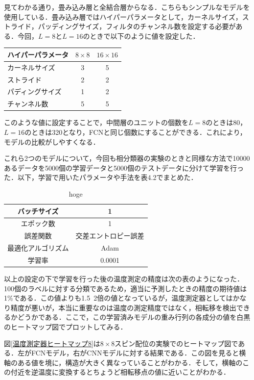 \documentclass[a4paper,11pt]{jsreport}
\begin{document}
見てわかる通り，畳み込み層と全結合層からなる．こちらもシンプルなモデルを使用している．畳み込み層ではハイパーパラメータとして，カーネルサイズ，ストライド，パッディングサイズ，フィルタのチャンネル数を設定する必要がある．今回，$L=8$と$L=16$のときで以下のように値を設定した．
\begin{center}
  \begin{tabular}{|l|c|c|} \hline
    ハイパーパラメータ& $8 \times 8$ & $16 \times 16$ \\ \hline
    カーネルサイズ & 3 & 5 \\
    ストライド & 2 & 2 \\ 
    パディングサイズ & 1 & 2 \\ 
    チャンネル数 & 5 & 5 \\ \hline 
  \end{tabular}
\end{center}
このような値に設定することで，中間層のユニットの個数を$L=8$のときは80，$L=16$のときは320となり，FCNと同じ個数にすることができる．これにより，モデルの比較がしやすくなる．\par
これら2つのモデルについて，今回も相分類器の実験のときと同様な方法で10000あるデータを5000個の学習データと5000個のテストデータに分けて学習を行った．以下，学習で用いたパラメータや手法を表4.2でまとめた．
\begin{table}[H]
  \centering
  \begin{tabular}{cc} \hline
    バッチサイズ & 1 \rule[0pt]{0pt}{1pt} \\ \hline
    エポック数 & 1 \rule[0pt]{0pt}{1pt} \\ \hline
    誤差関数 & 交差エントロピー誤差 \rule[0pt]{0pt}{1pt} \\\hline
    最適化アルゴリズム & Adam \rule[0pt]{0pt}{1pt} \\\hline
    学習率 & 0.0001 \rule[0pt]{0pt}{1pt} \\\hline
  \end{tabular}
  \caption{hoge}
  \label{学習で用いたもの2}
\end{table}
以上の設定の下で学習を行った後の温度測定の精度は次の表のようになった．
100個のラベルに対する分類であるため，適当に予測したときの精度の期待値は1\%である．この値よりも1.5~2倍の値となっているが，温度測定器としてはかなり精度が悪いが，本当に重要なのは温度の測定精度ではなく，相転移を検出できるかどうかである．ここで，この学習済みモデルの重み行列の各成分の値を白黒のヒートマップ図でプロットしてみる．\par
図\ref{温度測定器ヒートマップ8}は$8 \times 8$スピン配位の実験でのヒートマップ図である．左がFCNモデル，右がCNNモデルに対する結果である．この図を見ると横軸のある値を境に，構造が大きく異なっていることがわかる．そして，横軸のこの付近を逆温度に変換するとちょうど相転移点の値に近いことがわかる．\par
\end{document}
